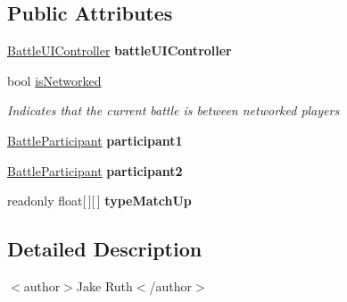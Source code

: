 \subsection*{Public Attributes}
\begin{DoxyCompactItemize}
\item 
\hypertarget{class_battle_handler_ad57da165c3aa4c3906b10dc80cca73e2}{\hyperlink{class_battle_u_i_controller}{Battle\-U\-I\-Controller} {\bfseries battle\-U\-I\-Controller}}\label{class_battle_handler_ad57da165c3aa4c3906b10dc80cca73e2}

\item 
bool \hyperlink{class_battle_handler_a91faa80b5273370273762c40a364305d}{is\-Networked}
\begin{DoxyCompactList}\small\item\em Indicates that the current battle is between networked players \end{DoxyCompactList}\item 
\hypertarget{class_battle_handler_a95fc9651e0a7845913c3a2bf1330e2cf}{\hyperlink{class_battle_participant}{Battle\-Participant} {\bfseries participant1}}\label{class_battle_handler_a95fc9651e0a7845913c3a2bf1330e2cf}

\item 
\hypertarget{class_battle_handler_a303ed561d4ed9408dfb02b03034ed2a9}{\hyperlink{class_battle_participant}{Battle\-Participant} {\bfseries participant2}}\label{class_battle_handler_a303ed561d4ed9408dfb02b03034ed2a9}

\item 
readonly float\mbox{[}$\,$\mbox{]}\mbox{[}$\,$\mbox{]} {\bfseries type\-Match\-Up}
\end{DoxyCompactItemize}


\subsection{Detailed Description}


$<$author$>$Jake Ruth$<$/author$>$ 

